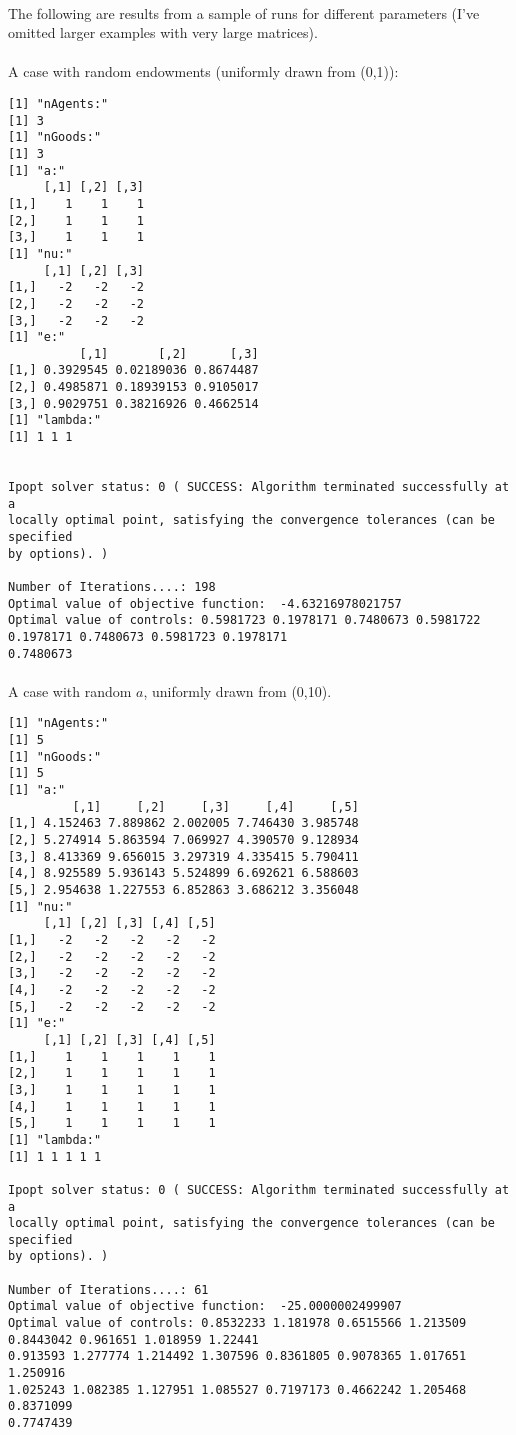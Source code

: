\documentclass[11pt]{article}
\begin{document}
\paragraph{} The following are results from a sample of runs for different parameters (I've omitted larger examples with very large matrices).
\paragraph{} A case with random endowments (uniformly drawn from (0,1)):
\begin{verbatim}
[1] "nAgents:"
[1] 3
[1] "nGoods:"
[1] 3
[1] "a:"
     [,1] [,2] [,3]
[1,]    1    1    1
[2,]    1    1    1
[3,]    1    1    1
[1] "nu:"
     [,1] [,2] [,3]
[1,]   -2   -2   -2
[2,]   -2   -2   -2
[3,]   -2   -2   -2
[1] "e:"
          [,1]       [,2]      [,3]
[1,] 0.3929545 0.02189036 0.8674487
[2,] 0.4985871 0.18939153 0.9105017
[3,] 0.9029751 0.38216926 0.4662514
[1] "lambda:"
[1] 1 1 1


Ipopt solver status: 0 ( SUCCESS: Algorithm terminated successfully at a 
locally optimal point, satisfying the convergence tolerances (can be specified 
by options). )

Number of Iterations....: 198 
Optimal value of objective function:  -4.63216978021757 
Optimal value of controls: 0.5981723 0.1978171 0.7480673 0.5981722 0.1978171 0.7480673 0.5981723 0.1978171 
0.7480673
\end{verbatim}

\paragraph{} A case with random $a$, uniformly drawn from (0,10).

\begin{verbatim}
[1] "nAgents:"
[1] 5
[1] "nGoods:"
[1] 5
[1] "a:"
         [,1]     [,2]     [,3]     [,4]     [,5]
[1,] 4.152463 7.889862 2.002005 7.746430 3.985748
[2,] 5.274914 5.863594 7.069927 4.390570 9.128934
[3,] 8.413369 9.656015 3.297319 4.335415 5.790411
[4,] 8.925589 5.936143 5.524899 6.692621 6.588603
[5,] 2.954638 1.227553 6.852863 3.686212 3.356048
[1] "nu:"
     [,1] [,2] [,3] [,4] [,5]
[1,]   -2   -2   -2   -2   -2
[2,]   -2   -2   -2   -2   -2
[3,]   -2   -2   -2   -2   -2
[4,]   -2   -2   -2   -2   -2
[5,]   -2   -2   -2   -2   -2
[1] "e:"
     [,1] [,2] [,3] [,4] [,5]
[1,]    1    1    1    1    1
[2,]    1    1    1    1    1
[3,]    1    1    1    1    1
[4,]    1    1    1    1    1
[5,]    1    1    1    1    1
[1] "lambda:"
[1] 1 1 1 1 1

Ipopt solver status: 0 ( SUCCESS: Algorithm terminated successfully at a 
locally optimal point, satisfying the convergence tolerances (can be specified 
by options). )

Number of Iterations....: 61 
Optimal value of objective function:  -25.0000002499907 
Optimal value of controls: 0.8532233 1.181978 0.6515566 1.213509 0.8443042 0.961651 1.018959 1.22441 
0.913593 1.277774 1.214492 1.307596 0.8361805 0.9078365 1.017651 1.250916 
1.025243 1.082385 1.127951 1.085527 0.7197173 0.4662242 1.205468 0.8371099 
0.7747439
\end{verbatim}
\end{document}
